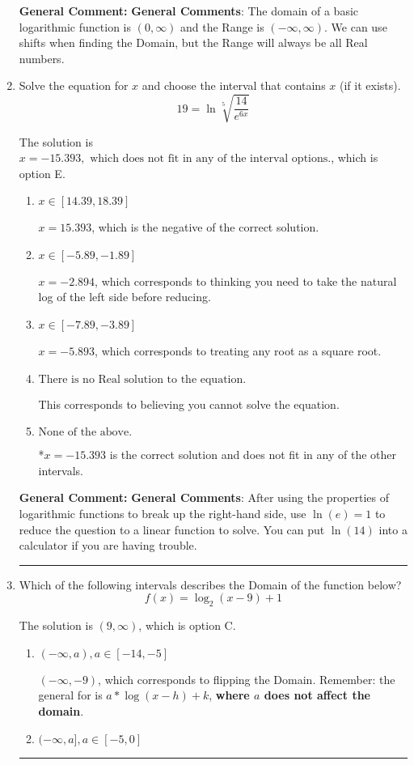 \documentclass{extbook}[14pt]
\newcommand{\litem}[1]{\item #1

\rule{\textwidth}{0.4pt}}
\begin{document}
\begin{enumerate}
{\textbf{General Comment:} \textbf{General Comments}: The domain of a basic logarithmic function is $(0, \infty)$ and the Range is $(-\infty, \infty)$. We can use shifts when finding the Domain, but the Range will always be all Real numbers.
}
\litem{
 Solve the equation for $x$ and choose the interval that contains $x$ (if it exists).
\[  19 = \ln{\sqrt[5]{\frac{14}{e^{6x}}}} \]

The solution is \( x = -15.393, \text{ which does not fit in any of the interval options.} \), which is option E.\begin{enumerate}[label=\Alph*.]
\item \( x \in [14.39, 18.39] \)

$x = 15.393$, which is the negative of the correct solution.
\item \( x \in [-5.89, -1.89] \)

$x = -2.894$, which corresponds to thinking you need to take the natural log of the left side before reducing.
\item \( x \in [-7.89, -3.89] \)

$x = -5.893$, which corresponds to treating any root as a square root.
\item \( \text{There is no Real solution to the equation.} \)

This corresponds to believing you cannot solve the equation.
\item \( \text{None of the above.} \)

*$x = -15.393$ is the correct solution and does not fit in any of the other intervals.
\end{enumerate}

\textbf{General Comment:} \textbf{General Comments}: After using the properties of logarithmic functions to break up the right-hand side, use $\ln(e) = 1$ to reduce the question to a linear function to solve. You can put $\ln(14)$ into a calculator if you are having trouble.
}
\litem{
Which of the following intervals describes the Domain of the function below?
\[ f(x) = \log_2{(x-9)}+1 \]

The solution is \( (9, \infty) \), which is option C.\begin{enumerate}[label=\Alph*.]
\item \( (-\infty, a), a \in [-14, -5] \)

$(-\infty, -9)$, which corresponds to flipping the Domain. Remember: the general for is $a*\log(x-h)+k$, \textbf{where $a$ does not affect the domain}.
\item \( (-\infty, a], a \in [-5, 0] \)


\end{enumerate}}
\end{enumerate}
\end{document}
